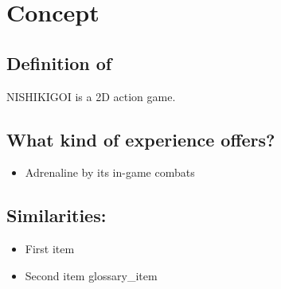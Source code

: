 %
%
%


\section{\projectname Concept}


\subsection{Definition of \projectname}
NISHIKIGOI is a 2D action game.


\subsection{What kind of experience \projectname offers?}
\begin{itemize}
\item Adrenaline by its in-game combats
\end{itemize}


\subsection{Similarities:}
\begin{itemize}

\item First item
\item Second item \gls{glossary_item}


\end{itemize}

